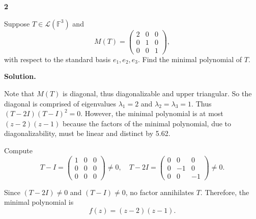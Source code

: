 \documentclass[11pt]{article}
\newcommand{\ProblemDivider}[1]{%
  \vspace{1.0em}
  \noindent\textbf{#1}\par
  \vspace{0.35em}
}
\newcommand{\ProblemAnnounce}{\noindent}
\newcommand{\SolutionAnnounce}{\noindent\textbf{Solution.}\par\medskip}
\begin{document}
\ProblemDivider{2}

\begin{problemBox}
\ProblemAnnounce
Suppose $T\in \mathcal{L}(\mathbb{F}^3)$ and
\[
M(T)=
\begin{pmatrix}
2 & 0 & 0\\
0 & 1 & 0\\
0 & 0 & 1
\end{pmatrix},
\]
with respect to the standard basis $e_1,e_2,e_3$. Find the minimal polynomial of $T$.
\end{problemBox}

\begin{solutionBox}
\SolutionAnnounce
\doublespacing

Note that $M(T)$ is diagonal, thus diagonalizable and upper triangular. So the diagonal is comprised of
eigenvalues $\lambda_1=2$ and $\lambda_2=\lambda_3=1$.
Thus $(T-2I)(T-I)^2=0$. However, the minimal polynomial is at most $(z-2)(z-1)$
because the factors of the minimal polynomial, due to diagonalizability, must be linear and distinct by 5.62.

Compute
\[
T-I=
\begin{pmatrix}
1 & 0 & 0\\
0 & 0 & 0\\
0 & 0 & 0
\end{pmatrix}
\neq 0,
\quad
T-2I=
\begin{pmatrix}
0 & 0 & 0\\
0 & -1 & 0\\
0 & 0 & -1
\end{pmatrix}
\neq 0.
\]

Since $(T-2I)\neq 0$ and $(T-I)\neq 0$, no factor annihilates $T$.
Therefore, the minimal polynomial is
\[
f(z)=(z-2)(z-1).
\]

\end{solutionBox}
\end{document}
